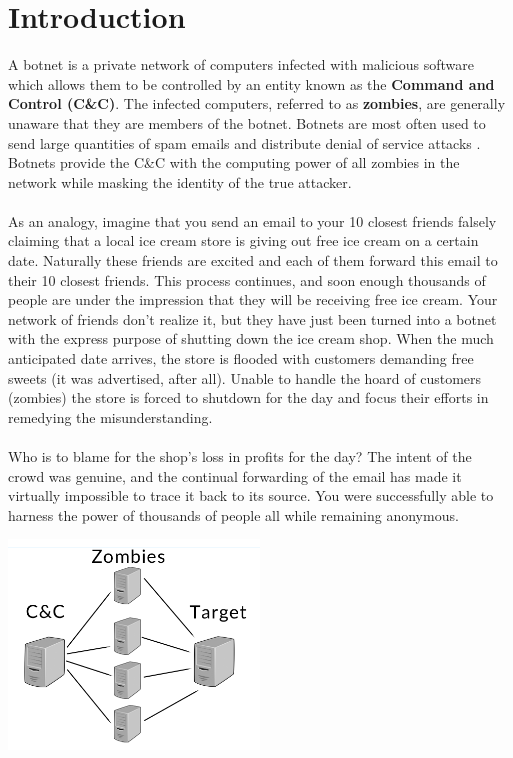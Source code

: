 \pagebreak

\section{Introduction}

A botnet is a private network of computers infected with malicious software which allows them to be controlled by an entity known as the \textbf{Command and Control (C\&C)}.
The infected computers, referred to as \textbf{zombies}, are generally unaware that they are members of the botnet. 
Botnets are most often used to send large quantities of spam emails and distribute denial of service attacks \cite{kapersky}.
Botnets provide the C\&C with the computing power of all zombies in the network while masking the identity of the true attacker.
\\ \\
As an analogy, imagine that you send an email to your 10 closest friends falsely claiming that a local ice cream store
is giving out free ice cream on a certain date.  Naturally these friends are excited and each of them forward this email
to their 10 closest friends.  This process continues, and soon enough thousands of people are under the impression
that they will be receiving free ice cream.
Your network of friends don't realize it, but they have just been turned into a botnet with the express purpose of shutting down the ice cream shop.
When the much anticipated date arrives, the store is flooded with customers demanding free sweets (it was advertised, after all).
Unable to handle the hoard of customers (zombies) the store is forced to shutdown for the day and focus their efforts in remedying the misunderstanding.
\\ \\
Who is to blame for the shop's loss in profits for the day?  The intent of the crowd was genuine,
and the continual forwarding of the email has made it virtually impossible to trace
it back to its source.  You were successfully able to harness the power of thousands
of people all while remaining anonymous.

\begin{center}
  \includegraphics[width=0.5\textwidth]{assets/botnet_example.png}
  \label{fig:botnet_example}
\end{center}

